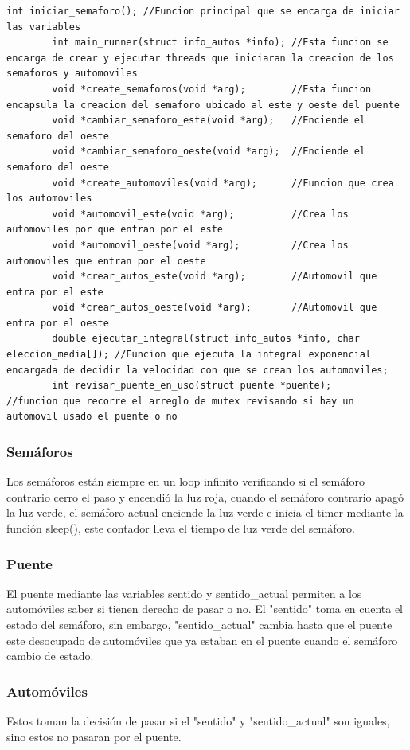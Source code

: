 \documentclass[16pt,a4papper]{article}
\begin{document}
	\begin{lstlisting}[style=CStyle]
		int iniciar_semaforo(); //Funcion principal que se encarga de iniciar las variables
		int main_runner(struct info_autos *info); //Esta funcion se encarga de crear y ejecutar threads que iniciaran la creacion de los semaforos y automoviles
		void *create_semaforos(void *arg);        //Esta funcion encapsula la creacion del semaforo ubicado al este y oeste del puente
		void *cambiar_semaforo_este(void *arg);   //Enciende el semaforo del oeste
		void *cambiar_semaforo_oeste(void *arg);  //Enciende el semaforo del oeste
		void *create_automoviles(void *arg);      //Funcion que crea los automoviles
		void *automovil_este(void *arg);          //Crea los automoviles por que entran por el este
		void *automovil_oeste(void *arg);         //Crea los automoviles que entran por el oeste
		void *crear_autos_este(void *arg);		  //Automovil que entra por el este	
		void *crear_autos_oeste(void *arg);       //Automovil que entra por el oeste
		double ejecutar_integral(struct info_autos *info, char eleccion_media[]); //Funcion que ejecuta la integral exponencial encargada de decidir la velocidad con que se crean los automoviles;
		int revisar_puente_en_uso(struct puente *puente);                         //funcion que recorre el arreglo de mutex revisando si hay un automovil usado el puente o no
	\end{lstlisting}

	\subsubsection{Semáforos}
	Los semáforos están siempre en un loop infinito verificando si el semáforo contrario cerro el paso y encendió la luz roja, cuando el semáforo contrario apagó la luz verde, el semáforo actual enciende la luz verde e inicia el timer mediante la función sleep(), este contador lleva el tiempo de luz verde del semáforo.
	
	\subsubsection{Puente}
	El puente mediante las variables sentido y sentido\_actual permiten a los automóviles saber si tienen derecho de pasar o no. El "sentido" toma en cuenta el estado del semáforo, sin embargo, "sentido\_actual" cambia hasta que el puente este desocupado de automóviles que ya estaban en el puente cuando el semáforo cambio de estado.
	
	\subsubsection{Automóviles}
	Estos toman la decisión de pasar si el "sentido" y "sentido\_actual" son iguales, sino estos no pasaran por el puente.
	
\end{document}
